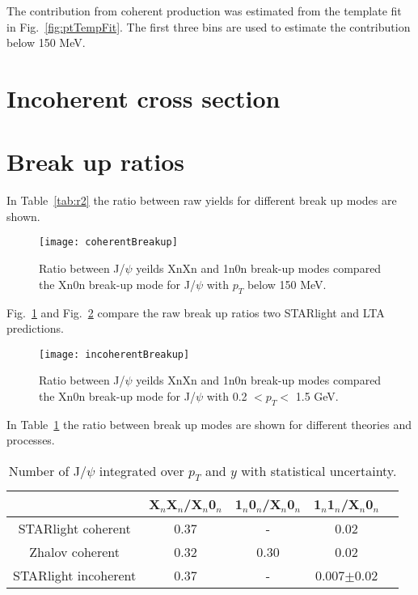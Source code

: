   The contribution from coherent production was estimated from the template fit
    in Fig.~\ref{fig:ptTempFit}.
  The first three bins are used to estimate the contribution below 150 MeV.

  \section{Incoherent cross section}
  \section{Break up ratios}
    In Table~\ref{tab:r2} the ratio between raw yields for different break up 
      modes are shown.
    \begin{figure}[!Hhtb]
      \centering
      \texttt{[image: coherentBreakup]}
      \caption{Ratio between J/$\psi$ yeilds XnXn and 1n0n break-up modes 
        compared the Xn0n break-up mode for J/$\psi$ with $p_{T}$ below 150 
        MeV.}
      \label{fig:coherentBreakUp}
    \end{figure}
   
    Fig.~\ref{fig:coherentBreakUp} and Fig.~\ref{fig:incoherentBreakUp} compare
      the raw break up ratios two STARlight and LTA predictions. 

    \begin{figure}[!Hhtb]
      \centering
      \texttt{[image: incoherentBreakup]}
      \caption{Ratio between J/$\psi$ yeilds XnXn and 1n0n break-up modes 
        compared the Xn0n break-up mode for J/$\psi$ with 0.2 $< p_{T} <$ 
        1.5 GeV.}
      \label{fig:incoherentBreakUp}
    \end{figure}

    In Table~\ref{tab:r3} the ratio between break up modes are shown for 
      different theories and processes.

    \begin{table}[h]
      \begin{center}
        \caption{Number of  J/$\psi$ integrated over $p_{T}$ and $y$ with statistical uncertainty.}
        \label{tab:r3}
        \begin{tabular}{|c|c|c|c|c|}
          \hline
          & X$_{n}$X$_{n}$/X$_{n}$0$_{n}$ & 1$_{n}$0$_{n}$/X$_{n}$0$_{n}$ & 1$_{n}$1$_{n}$/X$_{n}$0$_{n}$  \\ 
          \hline
          STARlight coherent &  0.37&-&0.02\\
          \hline
          Zhalov coherent& 0.32&0.30&0.02\\
          \hline
          STARlight incoherent &  0.37&-&0.007$\pm$0.02 \\
          \hline
        \end{tabular}
      \end{center}
    \end{table}
